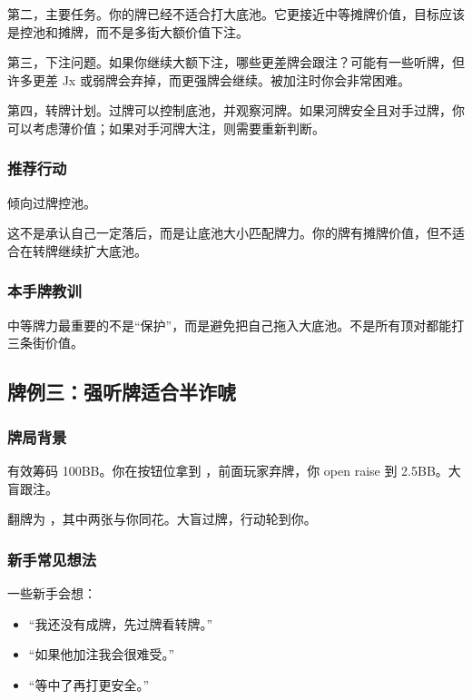 第二，主要任务。你的牌已经不适合打大底池。它更接近中等摊牌价值，目标应该是控池和摊牌，而不是多街大额价值下注。

第三，下注问题。如果你继续大额下注，哪些更差牌会跟注？可能有一些听牌，但许多更差 Jx 或弱牌会弃掉，而更强牌会继续。被加注时你会非常困难。

第四，转牌计划。过牌可以控制底池，并观察河牌。如果河牌安全且对手过牌，你可以考虑薄价值；如果对手河牌大注，则需要重新判断。

\subsubsection*{推荐行动}

倾向过牌控池。

这不是承认自己一定落后，而是让底池大小匹配牌力。你的牌有摊牌价值，但不适合在转牌继续扩大底池。

\subsubsection*{本手牌教训}

中等牌力最重要的不是“保护”，而是避免把自己拖入大底池。不是所有顶对都能打三条街价值。

\subsection{牌例三：强听牌适合半诈唬}

\subsubsection*{牌局背景}

有效筹码 100BB。你在按钮位拿到 ，前面玩家弃牌，你 open raise 到 2.5BB。大盲跟注。

翻牌为 ，其中两张与你同花。大盲过牌，行动轮到你。

\subsubsection*{新手常见想法}

一些新手会想：

\begin{itemize}
\item “我还没有成牌，先过牌看转牌。”
\item “如果他加注我会很难受。”
\item “等中了再打更安全。”
\end{itemize}

